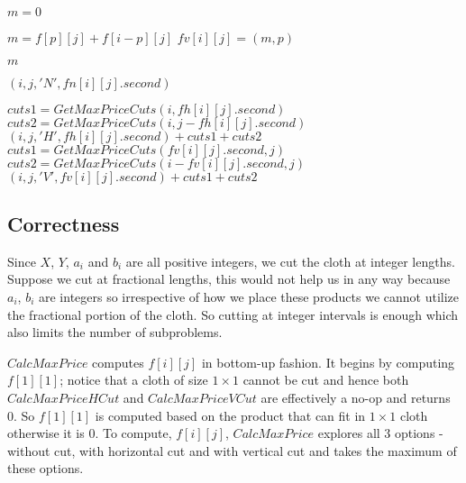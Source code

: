 \documentclass{article}
\begin{document}
\begin{algorithm}[H]
\begin{algorithmic}
                    \State $m = 0$

                                \State $m = f[p][j] + f[i-p][j]$
                                \State $fv[i][j] = (m, p)$
                            \EndIf
                        \EndFor
                    \EndIf

                    \State \Return $m$
                \EndProcedure

                        \State \Return
                    \EndIf

                        \State \Return $(i, j, 'N', fn[i][j].second)$
                    \EndIf

                        \State $cuts1 = GetMaxPriceCuts(i, fh[i][j].second)$
                        \State $cuts2 = GetMaxPriceCuts(i, j - fh[i][j].second)$
                        \State \Return $(i, j, 'H', fh[i][j].second) + cuts1 + cuts2$
                    \Else
                        \State $cuts1 = GetMaxPriceCuts(fv[i][j].second, j)$
                        \State $cuts2 = GetMaxPriceCuts(i - fv[i][j].second, j)$
                        \State \Return $(i, j, 'V', fv[i][j].second) + cuts1 + cuts2$
                    \EndIf
                \EndProcedure
            \end{algorithmic}
        \end{algorithm}

    \subsection*{Correctness}
    Since $X$, $Y$, $a_i$ and $b_i$ are all positive integers, we cut the cloth at integer lengths. Suppose we cut at fractional lengths, this would not help us in any way because $a_i$, $b_i$ are integers so irrespective of how we place these products we cannot utilize the fractional portion of the cloth. So cutting at integer intervals is enough which also limits the number of subproblems.

    $CalcMaxPrice$ computes $f[i][j]$ in bottom-up fashion. It begins by computing $f[1][1]$; notice that a cloth of size $1 \times 1$ cannot be cut and hence both $CalcMaxPriceHCut$ and $CalcMaxPriceVCut$ are effectively a no-op and returns 0. So $f[1][1]$ is computed based on the product that can fit in $1 \times 1$ cloth otherwise it is 0. To compute, $f[i][j]$, $CalcMaxPrice$ explores all 3 options - without cut, with horizontal cut and with vertical cut and takes the maximum of these options.
\end{document}
